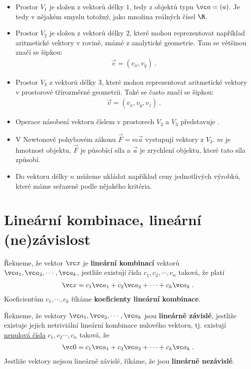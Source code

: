 \begin{itemize}
    \item Prostor $V_1$ je složen z vektorů délky $1$, tedy z objektů typu $ \vc a = (a)$. Je tedy v nějakém smyslu totožný, jako množina reálných čísel $\R$.
    \item Prostor $V_2$ je složen z vektorů délky $2$, které mohou reprezentovat například aritmetické vektory v rovině, známé z analytické geometrie. Tam se většinou značí se šipkou:
    \begin{align}
        \overrightarrow{v} = (v_x,v_y) \:.
    \end{align}
    \item Prostor $V_3$ z vektorů délky $3$, které mohou reprezentovat aritmetické vektory v prostorové třírozměrné geometrii. Také se často značí se šipkou:
    \begin{align}
        \overrightarrow{v} = (v_x,v_y,v_z) \:.
    \end{align}
    \item Operace násobení vektoru číslem v prostorech $V_2$ a $V_3$ představuje .
    \item V Newtonově pohybovém zákonu $\overrightarrow{F} = m \overrightarrow{a}$ vystupují vektory z $V_3$. $m$ je hmotnost objektu, $\overrightarrow{F}$ je působící síla a $\overrightarrow{a}$ je zrychlení objektu, které tato síla způsobí.
    \item Do vektoru délky $n$ můžeme ukládat například ceny jednotlivých výrobků, které máme seřazené podle nějakého kritéria.
\end{itemize}

\section{Lineární kombinace, lineární (ne)závislost}

Řekneme, že vektor $\vc x$ je \textbf{lineární kombinací} vektorů $\vc a_1, \vc a_2, \cdots, \vc a_k$, jestliže existují čísla $c_1, c_2, \cdots, c_n$ taková, že platí \begin{align}
    \vc x = c_1 \vc a_1 + c_2 \vc a_2 + \cdots + c_k \vc a_k \:.
\end{align}
Koeficientům $c_1, \cdots, c_k$ říkáme \textbf{koeficienty lineární kombinace}. 

Řekneme, že vektory $\vc a_1, \vc a_2, \cdots, \vc a_k$ jsou \textbf{lineárně závislé}, jestliže existuje jejich netriviální lineární kombinace nulového vektoru, tj. existují \underline{nenulová čísla} $c_1, c_2 \cdots, c_n$ taková, že \begin{align}
    \vc 0 = c_1 \vc a_1 + c_2 \vc a_2 + \cdots + c_k \vc a_k \:.
\end{align}
Jestliže vektory nejsou lineárně závislé, říkáme, že jsou \textbf{lineárně nezávislé}.

